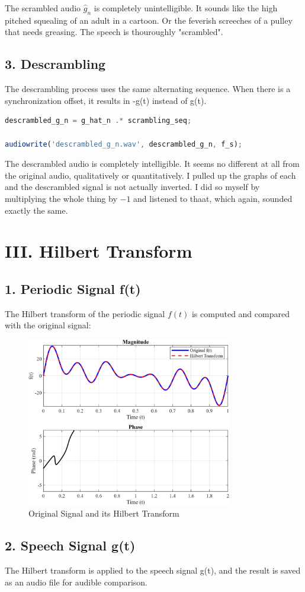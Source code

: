 \documentclass[12pt]{article}
\begin{document}
The scrambled audio $\hat{g}_n$ is completely unintelligible. It sounds like the high pitched squealing of an adult in a cartoon. Or the feverish screeches of a pulley that needs greasing. The speech is thouroughly "scrambled".


\newpage
\subsection*{3. Descrambling}
The descrambling process uses the same alternating sequence. When there is a synchronization offset, it results in -g(t) instead of g(t).

\begin{lstlisting}[language=Octave, caption=Descrambling]
descrambled_g_n = g_hat_n .* scrambling_seq;

audiowrite('descrambled_g_n.wav', descrambled_g_n, f_s);
\end{lstlisting}

The descrambled audio is completely intelligible. It seems no different at all from the original audio, qualitatively or quantitatively. I pulled up the graphs of each and the descrambled signal is not actually inverted. I did so myself by multiplying the whole thing by $-1$ and listened to thaat, which again, sounded exactly the same.

\newpage
\section*{III. Hilbert Transform}

\subsection*{1. Periodic Signal f(t)}
The Hilbert transform of the periodic signal $f(t)$ is computed and compared with the original signal:

\begin{figure}[H]
    \centering
    \includegraphics[width=0.8\textwidth]{f_t.png}
    \caption{Original Signal and its Hilbert Transform}
\end{figure}


\newpage
\subsection*{2. Speech Signal g(t)}
The Hilbert transform is applied to the speech signal g(t), and the result is saved as an audio file for audible comparison.
\end{document}
